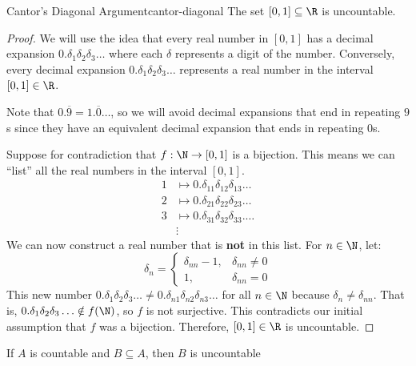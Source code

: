 \documentclass[letterpaper,12pt]{report}
\begin{document}
\begin{thmbox}{Cantor's Diagonal Argument}{cantor-diagonal}
    The set $[0,1] \subseteq \R$ is uncountable.
    \tcblower
    \begin{proof}
        We will use the idea that every real number in $[0,1]$ has a decimal expansion $0.\delta_1 \delta_2 \delta_3 \ldots$ where each $\delta$ represents a digit of the number. Conversely, every decimal expansion $0.\delta_1 \delta_2 \delta_3 \ldots$ represents a real number in the interval $[0,1] \in \R$.

        \begin{notebox}{}
            Note that $0.\overline{9} = 1.\overline{0}\ldots$, so we will avoid decimal expansions that end in repeating $9$s since they have an equivalent decimal expansion that ends in repeating $0$s.
        \end{notebox}

        Suppose for contradiction that $f : \N \to [0,1]$ is a bijection. This means we can ``list'' all the real numbers in the interval $[0,1]$.
        \begin{align*}
            1 &\mapsto 0.\delta_{11} \delta_{12} \delta_{13} \ldots \\
            2 &\mapsto 0.\delta_{21} \delta_{22} \delta_{23} \ldots \\
            3 &\mapsto 0.\delta_{31} \delta_{32} \delta_{33} . \ldots \\
            & \vdots
        \end{align*}
        We can now construct a real number that is \textbf{not} in this list. For $n \in \N$, let:
        \[ \delta_n = { \begin{cases}
                \delta_{nn} - 1, & \delta_{nn} \neq 0 \\
                1, & \delta_{nn} = 0
            \end{cases} } \]
        This new number $0.\delta_1 \delta_2 \delta_3 \ldots \neq 0.\delta_{n1} \delta_{n2} \delta_{n3} \ldots$ for all $n \in \N$ because $\delta_n \neq \delta_{nn}$. That is, $0.\delta_1 \delta_2 \delta_3 \ldots \notin f(\N)$, so $f$ is not surjective. This contradicts our initial assumption that $f$ was a bijection. Therefore, $[0,1] \in \R$ is uncountable.
    \end{proof}
\end{thmbox}

\begin{exbox}{}{}
    If $A$ is countable and $B \subseteq A$, then $B$ is uncountable
\end{exbox}
\end{document}
